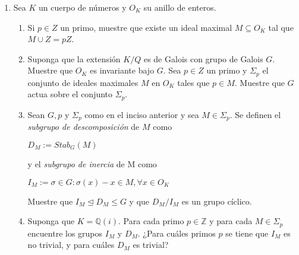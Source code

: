 \documentclass[spanish,a4paper,12pt]{article}
\def\Z{{\mathbb Z}}
\def\Q{{\mathbb Q}}
\begin{document}
\begin{enumerate}
  \begin{center}
    \rule[2mm]{4.3cm}{0.5pt}
    \rule[2mm]{4.3cm}{0.5pt}
  \end{center}
  
  \item Sea $K$ un cuerpo de números y $O_K$ su anillo de enteros.
  \begin{enumerate}
    \item Si $p \in Z$ un primo, muestre que existe un ideal maximal $M \subseteq O_K$ tal que $M \cup Z = pZ$.
    \item Suponga que la extensión $K/Q$ es de Galois con grupo de Galois $G$. Muestre que $O_K$ es invariante bajo $G$. Sea $p \in Z$ un primo y $\Sigma_p$ el conjunto de ideales maximales $M$ en $O_K$ tales que $p \in M$. Muestre que $G$ actua sobre el conjunto $\Sigma_p$.
    \item Sean $G, p$ y $\Sigma_p$ como en el inciso anterior y sea $M \in \Sigma_p$. Se definen el \textit{subgrupo de descomposición} de $M$ como
      \begin{center}
        $D_M := Stab_G (M)$
      \end{center}
    y el \textit{subgrupo de inercia} de M como
      \begin{center}
        $I_M := {\sigma \in G : \sigma(x) - x \in M, \forall x \in O_K}$
      \end{center}
    Muestre que $I_M \trianglelefteq D_M \leq G$ y que $D_M/I_M$ es un grupo cíclico.
    \item Suponga que $K = \Q(i)$. Para cada primo $p \in \Z$ y para cada $M \in \Sigma_p$ encuentre los grupos $I_M$ y $D_M$. ¿Para cuáles primos $p$ se tiene que $I_M$ es no trivial, y para cuáles $D_M$ es trivial?
  \end{enumerate}
\end{enumerate}
\end{document}
